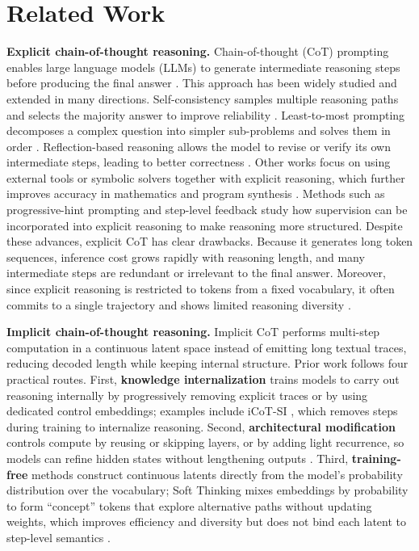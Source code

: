 


\section{Related Work}
\label{appendix:related}

\noindent \textbf{Explicit chain-of-thought reasoning.}  
Chain-of-thought (CoT) prompting enables large language models (LLMs) to generate intermediate reasoning steps before producing the final answer \citep{wei2023chainofthoughtpromptingelicitsreasoning}.  
This approach has been widely studied and extended in many directions. Self-consistency samples multiple reasoning paths and selects the majority answer to improve reliability \citep{wang2023selfconsistency}.  
Least-to-most prompting decomposes a complex question into simpler sub-problems and solves them in order \citep{zhou2023least}.  
Reflection-based reasoning allows the model to revise or verify its own intermediate steps, leading to better correctness \citep{shinn2023reflexion, madaan2023self}.  
Other works focus on using external tools or symbolic solvers together with explicit reasoning, which further improves accuracy in mathematics and program synthesis \citep{yao2023react}.  
Methods such as progressive-hint prompting \citep{zheng2023progressive} and step-level feedback \citep{wei2025survey} study how supervision can be incorporated into explicit reasoning to make reasoning more structured.  
Despite these advances, explicit CoT has clear drawbacks. Because it generates long token sequences, inference cost grows rapidly with reasoning length, and many intermediate steps are redundant or irrelevant to the final answer.  
Moreover, since explicit reasoning is restricted to tokens from a fixed vocabulary, it often commits to a single trajectory and shows limited reasoning diversity \citep{li2025implicit, zhang2025soft, xu2025softcot}. 

\noindent \textbf{Implicit chain-of-thought reasoning.}
Implicit CoT performs multi-step computation in a continuous latent space instead of emitting long textual traces, reducing decoded length while keeping internal structure. Prior work follows four practical routes. First, \textbf{knowledge internalization} trains models to carry out reasoning internally by progressively removing explicit traces or by using dedicated control embeddings; examples include iCoT-SI \citep{icot}, which removes steps during training to internalize reasoning. Second, \textbf{architectural modification} controls compute by reusing or skipping layers, or by adding light recurrence, so models can refine hidden states without lengthening outputs \citep{loop,innerthinking,ccot,tokenassorted,cotformer,geiping2025scaling}. Third, \textbf{training-free} methods construct continuous latents directly from the model’s probability distribution over the vocabulary; Soft Thinking mixes embeddings by probability to form “concept” tokens that explore alternative paths without updating weights, which improves efficiency and diversity but does not bind each latent to step-level semantics \citep{zhang2025soft,wu2025llms}. 

